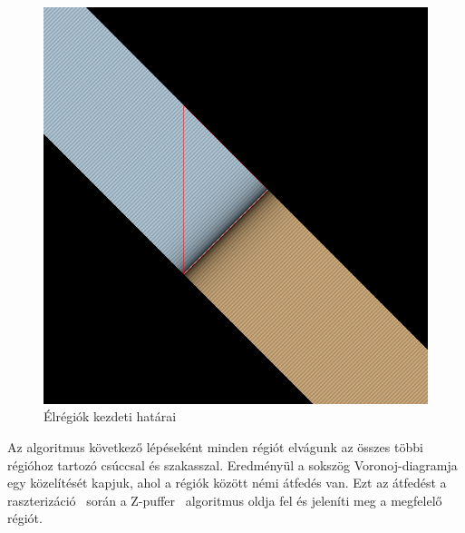 \begin{figure}[H]
	\centering
	\includegraphics[width=.6\linewidth]{images/initial_segment_regions.png}
	\caption{Élrégiók kezdeti határai}
	\label{fig:initial_segment_regions-1}
\end{figure}

Az algoritmus következő lépéseként minden régiót elvágunk az összes többi régióhoz tartozó csúccsal és szakasszal. Eredményül a sokszög Voronoj-diagramja egy közelítését kapjuk, ahol a régiók között némi átfedés van. Ezt az átfedést a raszterizáció~\cite{rasterization} során a Z-puffer~\cite{depthtest} algoritmus oldja fel és jeleníti meg a megfelelő régiót.

